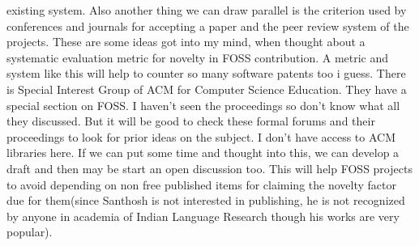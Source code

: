 existing system. Also another thing we can draw parallel is the criterion used
by conferences and journals for accepting a paper and the peer review system
of the projects.  These are some ideas got into my mind, when thought about a
systematic evaluation metric for novelty in FOSS contribution. A metric
and system like this will help to counter so many software patents too i guess.
There is Special Interest Group of ACM for Computer Science Education.
They have a special section on FOSS. I haven't seen the proceedings so
don't know what all they discussed. But it will be good to check these
formal forums and their proceedings to look for prior ideas on the subject.
I don't have access to ACM libraries here.  If we can put some time and
thought into this, we can develop a draft and then may be start an open
discussion too. This will help FOSS projects to avoid depending on non
free published items for claiming the novelty factor due for them(since
Santhosh is not interested in publishing, he is not recognized by anyone
in  academia of Indian Language Research though his works are very popular).


